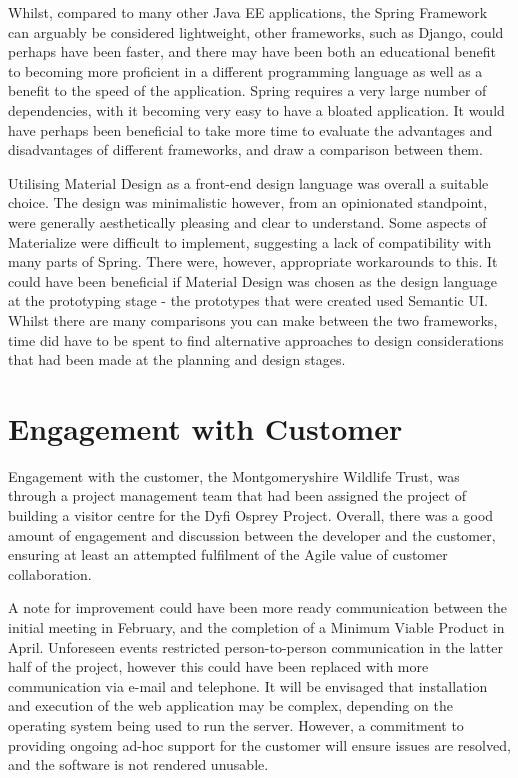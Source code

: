 Whilst, compared to many other Java EE applications, the Spring Framework can arguably be considered lightweight, other frameworks, such as Django, could perhaps have been faster, and there may have been both an educational benefit to becoming more proficient in a different programming language as well as a benefit to the speed of the application. Spring requires a very large number of dependencies, with it becoming very easy to have a bloated application. It would have perhaps been beneficial to take more time to evaluate the advantages and disadvantages of different frameworks, and draw a comparison between them.

Utilising Material Design as a front-end design language was overall a suitable choice. The design was minimalistic however, from an opinionated standpoint, were generally aesthetically pleasing and clear to understand. Some aspects of Materialize were difficult to implement, suggesting a lack of compatibility with many parts of Spring. There were, however, appropriate workarounds to this. It could have been beneficial if Material Design was chosen as the design language at the prototyping stage - the prototypes that were created used Semantic UI. Whilst there are many comparisons you can make between the two frameworks, time did have to be spent to find alternative approaches to design considerations that had been made at the planning and design stages.

\section{Engagement with Customer}

Engagement with the customer, the Montgomeryshire Wildlife Trust, was through a project management team that had been assigned the project of building a visitor centre for the Dyfi Osprey Project. Overall, there was a good amount of engagement and discussion between the developer and the customer, ensuring at least an attempted fulfilment of the Agile value of customer collaboration.

A note for improvement could have been more ready communication between the initial meeting in February, and the completion of a Minimum Viable Product in April. Unforeseen events restricted person-to-person communication in the latter half of the project, however this could have been replaced with more communication via e-mail and telephone. It will be envisaged that installation and execution of the web application may be complex, depending on the operating system being used to run the server. However, a commitment to providing ongoing ad-hoc support for the customer will ensure issues are resolved, and the software is not rendered unusable.
 
